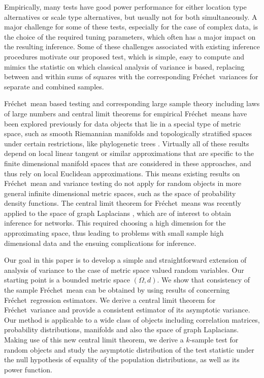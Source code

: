 \documentclass[lineno]{biometrika}
\def\cp{\citep}
\def\cp{\citep}
\def\O{\Omega}
\def\F{Fr\'{e}chet}
\begin{document}
Empirically, many tests have good power performance for either location type alternatives or scale type alternatives, but usually not for both simultaneously. A major challenge for some of these tests, especially for the case of complex data, is the choice of the required tuning parameters, which often has a major impact on the resulting inference. Some of these challenges associated with existing inference procedures motivate our proposed test, which is simple, easy to compute and mimics the statistic on which classical analysis of variance is based, replacing between and within sums of squares with the corresponding \F \ variances
for separate and combined samples.

\F \ mean based testing and corresponding large sample theory including laws of large numbers and central limit theorems for empirical \F \ means have been explored previously for data objects that lie in a special type of  metric space, such as smooth Riemannian manifolds \cp{bhat:03, bhat:05, bhat:12} and topologically stratified spaces under certain restrictions, like phylogenetic trees \cp{kend:11,bard:13,bhat:13}. Virtually all of these results depend on local linear tangent or similar approximations that are specific to the finite dimensional manifold spaces that are considered in these approaches, and thus rely on local Euclidean approximations. This means %
{existing results on \F \ mean and variance testing} do not apply for random objects in more general {infinite dimensional} metric spaces, such as the space of probability density functions. The central limit theorem for \F \ means was recently applied to the space of graph Laplacians \cp{gine:17}, which are of interest to obtain inference for networks. This required choosing a high dimension for the approximating space, thus leading to problems with small sample high dimensional data and the ensuing complications for inference.

Our goal in this paper is to develop a simple and straightforward extension of analysis of variance to the case of metric space valued random variables. Our starting point is a bounded metric space $(\O,d)$. We show that consistency of the sample \F$\,$ mean can be obtained  by using results of \cite{mull:19:3} concerning \F \ regression estimators. We derive a central limit theorem for \F \ variance and provide a consistent estimator of its asymptotic variance. Our method is applicable to a wide class of objects including correlation matrices,  probability distributions, manifolds and also the space of graph Laplacians. Making use of this new central limit theorem, we derive a  $k$-sample test for random objects and study the asymptotic distribution of the test statistic under the null hypothesis of equality of the population distributions, as well as its power function.
\end{document}
